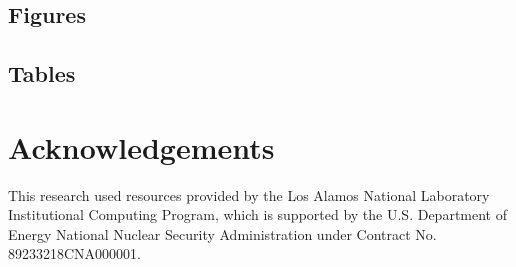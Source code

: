 \documentclass[draft]{styles/agujournal2019}
\begin{document}
\subsection{Figures}

\subsection{Tables}


\section{Acknowledgements}

This research used resources provided by the Los Alamos National Laboratory Institutional Computing Program, which is supported by the U.S. Department of Energy National Nuclear Security Administration under Contract No. 89233218CNA000001.
\end{document}
